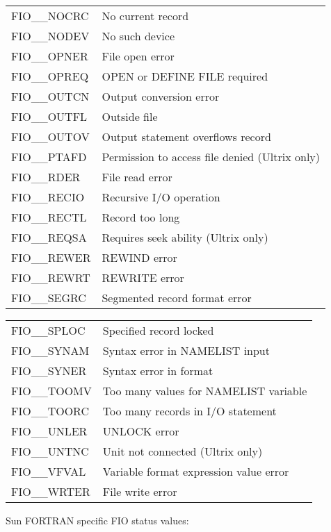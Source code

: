 \documentclass[twoside,11pt,nolof]{starlink}
\begin{document}
\begin{tabular}{ll}
FIO\_\_NOCRC & No current record \\
FIO\_\_NODEV & No such device \\
FIO\_\_OPNER & File open error \\
FIO\_\_OPREQ & OPEN or DEFINE FILE required \\
FIO\_\_OUTCN & Output conversion error \\
FIO\_\_OUTFL & Outside file \\
FIO\_\_OUTOV & Output statement overflows record \\
FIO\_\_PTAFD & Permission to access file denied (Ultrix only) \\
FIO\_\_RDER  & File read error \\
FIO\_\_RECIO & Recursive I/O operation \\
FIO\_\_RECTL & Record too long \\
FIO\_\_REQSA & Requires seek ability (Ultrix only) \\
FIO\_\_REWER & REWIND error \\
FIO\_\_REWRT & REWRITE error \\
FIO\_\_SEGRC & Segmented record format error \\
\end{tabular}

\begin{tabular}{ll}
FIO\_\_SPLOC & Specified record locked \\
FIO\_\_SYNAM & Syntax error in NAMELIST input \\
FIO\_\_SYNER & Syntax error in format \\
FIO\_\_TOOMV & Too many values for NAMELIST variable \\
FIO\_\_TOORC & Too many records in I/O statement \\
FIO\_\_UNLER & UNLOCK error \\
FIO\_\_UNTNC & Unit not connected (Ultrix only) \\
FIO\_\_VFVAL & Variable format expression value error \\
FIO\_\_WRTER & File write error \\
\end{tabular}

Sun FORTRAN specific FIO status values:
\end{document}
